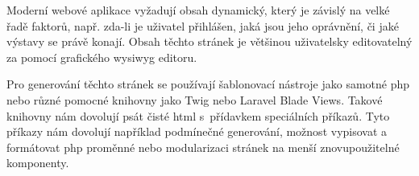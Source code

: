 Moderní webové aplikace vyžadují obsah dynamický, který je závislý na velké řadě faktorů, např. zda-li je uživatel přihlášen, jaká jsou jeho oprávnění, či jaké výstavy se právě konají. Obsah těchto stránek je většinou uživatelsky editovatelný za pomocí grafického \acrshort{wysiwyg} editoru.

Pro generování těchto stránek se používají šablonovací nástroje jako samotné \acrshort{php} nebo různé pomocné knihovny jako Twig\cite{twig} nebo Laravel Blade Views\cite{laravel-blade}. Takové knihovny nám dovolují psát čisté \acrshort{html} s~přídavkem speciálních příkazů. Tyto příkazy nám dovolují například podmínečné generování, možnost vypisovat a formátovat \acrshort{php} proměnné nebo modularizaci stránek na menší znovupoužitelné komponenty.

